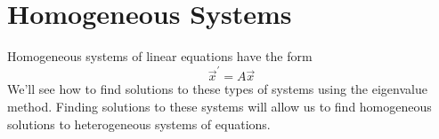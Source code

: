 \section{Homogeneous Systems}
\noindent
Homogeneous systems of linear equations have the form
\begin{equation*}
	\vec{x}^\prime = A\vec{x}
\end{equation*}
We'll see how to find solutions to these types of systems using the eigenvalue method. Finding solutions to these systems will allow us to find homogeneous solutions to heterogeneous systems of equations.

